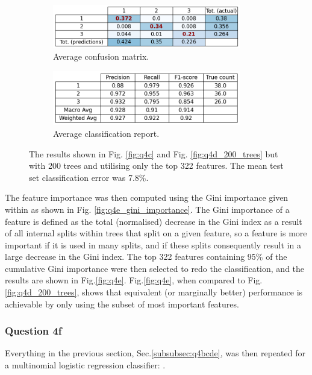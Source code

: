     \begin{figure}[htb]
    \centering
    \begin{subfigure}{0.5\textwidth}
        \centering
        \includegraphics[width=0.9\textwidth]{./figures/q4e_confusion_matrix}
        \caption{Average confusion matrix.}
        \label{fig:q4e_confusion_matrix}
    \end{subfigure}%
    \begin{subfigure}{0.5\textwidth}
        \centering
        \includegraphics[width=0.9\textwidth]{./figures/q4e_classification_report}
        \caption{Average classification report.}
        \label{fig:q4e_classification_report}
    \end{subfigure}
    \caption{The results shown in Fig. \eqref{fig:q4c} and Fig. \eqref{fig:q4d_200_trees} but with 200 trees and
        utilising only the top 322 features. The mean test set classification error was 7.8\%.}
    \label{fig:q4e}
    \end{figure}

    The feature importance was then computed using the Gini importance given within
     as shown in Fig. \eqref{fig:q4e_gini_importance}.
    The Gini importance of a feature is defined as the total (normalised) decrease in the Gini index as a result of all
    internal splits within trees that split on a given feature, so a feature is more important if it is used in many
    splits, and if these splits consequently result in a large decrease in the Gini index.
    The top 322 features containing 95\% of the cumulative Gini importance were then selected to redo the classification,
    and the results are shown in Fig.\eqref{fig:q4e}.
    Fig.\eqref{fig:q4e}, when compared to Fig.\eqref{fig:q4d_200_trees}, shows that equivalent (or marginally better)
    performance is achievable by only using the subset of most important features.

\subsubsection{Question 4f}\label{subsubsec:qf}
    Everything in the previous section, Sec.\eqref{subsubsec:q4bcde}, was then repeated for a multinomial logistic
    regression classifier: .
